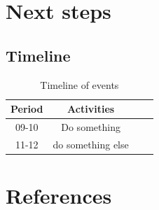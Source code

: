 \documentclass[
  ,doc,11pt, twoside,floatsintext]{apa6}
\begin{document}
\newpage

\hypertarget{next-steps}{%
\section{Next steps}\label{next-steps}}

\hypertarget{timeline}{%
\subsection{Timeline}\label{timeline}}

\begin{table}[h]
\begin{center}
\begin{threeparttable}
\caption{\label{tab:timeline_table}Timeline of events}
\begin{tabular}{cccc}
\toprule
Period & \multicolumn{1}{c}{Activities}\\
\midrule
09-10 & Do something\\
11-12 & do something else\\
\bottomrule
\end{tabular}
\end{threeparttable}
\end{center}
\end{table}

\newpage

\hypertarget{references}{%
\section{References}\label{references}}

\setlength{\parindent}{-0.5in}
\setlength{\leftskip}{0.5in}
\end{document}

